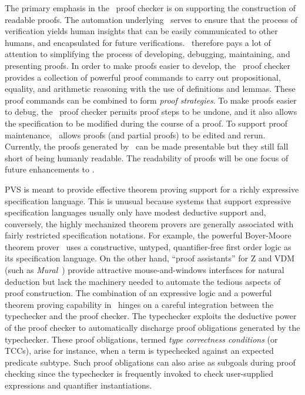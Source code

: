 \documentclass[12pt,twoside]{book}
\begin{document}
The primary emphasis in the \pvs\ proof checker is on supporting the
construction of readable proofs.  The  automation underlying
\pvs\ serves to ensure that the process of verification yields human
insights that can be easily communicated to other humans, and
encapsulated for future verifications.  \pvs\ therefore pays a lot of
attention to simplifying the process of developing, debugging,
maintaining, and presenting proofs.  In order to make proofs easier to
develop, the \pvs\ proof checker provides a collection of powerful proof
commands to carry out propositional, equality, and arithmetic reasoning
with the use of definitions and lemmas.  These proof commands can be
combined to form \emph{proof strategies}.  To make proofs easier to
debug, the \pvs\ proof checker permits proof steps to be undone, and it
also allows the specification to be modified during the course of a
proof.  To support proof maintenance, \pvs\ allows proofs (and partial
proofs) to be edited and rerun.  Currently, the proofs generated by
\pvs\ can be made presentable but they still fall short of being humanly
readable.   The readability of proofs will be one focus of future
enhancements to \pvs\@.

PVS is meant to provide effective theorem proving support for a richly
expressive specification language.  This is unusual because systems that
support expressive specification languages usually only have modest
deductive support and, conversely, the highly mechanized theorem provers
are generally associated with fairly restricted specification notations.
For example, the powerful Boyer-Moore theorem prover~\cite{Boyer-Moore88} uses a constructive, untyped,
quantifier-free first order logic as its specification language.  On the
other hand, ``proof assistants'' for Z and VDM (such
as {\sl Mural}~\cite{VDM-in-mural}) provide attractive mouse-and-windows
interfaces for natural deduction but lack the machinery needed to automate
the tedious aspects of proof construction.  The combination of an
expressive logic and a powerful theorem proving capability in \pvs\ hinges
on a careful integration between the typechecker and the proof checker.
The typechecker exploits the deductive power of the proof checker to
automatically discharge proof obligations generated by the typechecker.
These proof obligations, termed \emph{type correctness conditions} (or TCCs), arise
for instance, when a term is typechecked against an expected predicate
subtype.  Such proof obligations can also arise as subgoals during proof
checking since the typechecker is frequently invoked to check
user-supplied expressions and quantifier instantiations.
\end{document}
